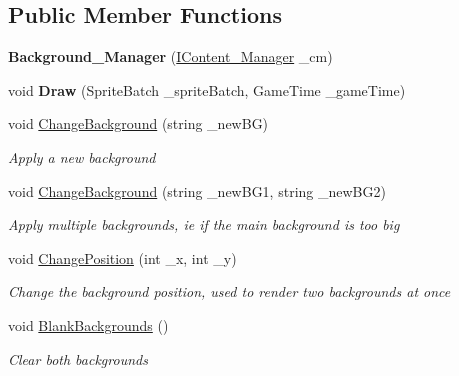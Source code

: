 \subsection*{Public Member Functions}
\begin{DoxyCompactItemize}
\item 
\mbox{\label{class_g_m_t_b_1_1_managers_1_1_background___manager_a7342c354f06f76a74acb9334cd5b2003}} 
{\bfseries Background\+\_\+\+Manager} (\mbox{\hyperlink{interface_g_m_t_b_1_1_interfaces_1_1_i_content___manager}{I\+Content\+\_\+\+Manager}} \+\_\+cm)
\item 
\mbox{\label{class_g_m_t_b_1_1_managers_1_1_background___manager_ae238607ebb44c74b7094784c5d21e5a5}} 
void {\bfseries Draw} (Sprite\+Batch \+\_\+sprite\+Batch, Game\+Time \+\_\+game\+Time)
\item 
void \mbox{\hyperlink{class_g_m_t_b_1_1_managers_1_1_background___manager_adf1fcea640b47d024d4d9f1de60ec263}{Change\+Background}} (string \+\_\+new\+BG)
\begin{DoxyCompactList}\small\item\em Apply a new background \end{DoxyCompactList}\item 
void \mbox{\hyperlink{class_g_m_t_b_1_1_managers_1_1_background___manager_a71e24c2d23e5a495178ffb5b5dd27a41}{Change\+Background}} (string \+\_\+new\+B\+G1, string \+\_\+new\+B\+G2)
\begin{DoxyCompactList}\small\item\em Apply multiple backgrounds, ie if the main background is too big \end{DoxyCompactList}\item 
void \mbox{\hyperlink{class_g_m_t_b_1_1_managers_1_1_background___manager_a3e050e37529783f5fea2fb2f8a0e893c}{Change\+Position}} (int \+\_\+x, int \+\_\+y)
\begin{DoxyCompactList}\small\item\em Change the background position, used to render two backgrounds at once \end{DoxyCompactList}\item 
void \mbox{\hyperlink{class_g_m_t_b_1_1_managers_1_1_background___manager_a1fe95031054d5acc37513eac1204215a}{Blank\+Backgrounds}} ()
\begin{DoxyCompactList}\small\item\em Clear both backgrounds \end{DoxyCompactList}\end{DoxyCompactItemize}
